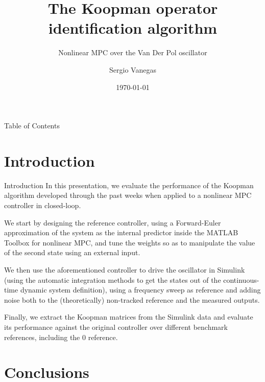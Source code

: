 \documentclass{beamer}
\title[Process]{The Koopman operator identification algorithm}
\subtitle{Nonlinear MPC over the Van Der Pol oscillator}
\institute[Polimi]{Politecnico di Milano}
\author{Sergio Vanegas}
\date{\today}
\begin{document}
\begin{frame}
    \maketitle
\end{frame}

\begin{frame}{Table of Contents}
    \tableofcontents
\end{frame}

\section{Introduction}

\begin{frame}{Introduction}
    In this presentation, we evaluate the performance of the Koopman algorithm developed through the past weeks when applied to a nonlinear MPC controller in closed-loop.

    We start by designing the reference controller, using a Forward-Euler approximation of the system as the internal predictor inside the MATLAB Toolbox for nonlinear MPC, and tune the weights so as to manipulate the value of the second state using an external input.

    We then use the aforementioned controller to drive the oscillator in Simulink (using the automatic integration methods to get the states out of the continuous-time dynamic system definition), using a frequency sweep as reference and adding noise both to the (theoretically) non-tracked reference and the measured outputs.

    Finally, we extract the Koopman matrices from the Simulink data and evaluate its performance against the original controller over different benchmark references, including the 0 reference.
\end{frame}


\section{Conclusions}
\end{document}

